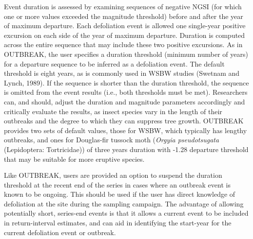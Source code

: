 \documentclass[review]{elsarticle} %
\begin{document}
Event duration is assessed by examining sequences of negative NGSI (for which one or more values exceeded the magnitude threshold) before and after the year of maximum departure. Each defoliation event is allowed one single-year positive excursion on each side of the year of maximum departure. Duration is computed across the entire sequence that may include these two positive excursions. As in OUTBREAK, the user specifies a duration threshold (minimum number of years) for a departure sequence to be inferred as a defoliation event. The default threshold is eight years, as is commonly used in WSBW studies (Swetnam and Lynch, 1989). If the sequence is shorter than the duration threshold, the sequence is omitted from the event results (i.e., both thresholds must be met). Researchers can, and should, adjust the duration and magnitude parameters accordingly and critically evaluate the results, as insect species vary in the length of their outbreaks and the degree to which they can suppress tree growth. OUTBREAK provides two sets of default values, those for WSBW, which typically has lengthy outbreaks, and ones for Douglas-fir tussock moth (\emph{Orgyia pseudotsugata} (Lepidoptera: Tortricidae)) of three years duration with -1.28 departure threshold that may be suitable for more eruptive species.

Like OUTBREAK, users are provided an option to suspend the duration threshold at the recent end of the series in cases where an outbreak event is known to be ongoing. This should be used if the user has direct knowledge of defoliation at the site during the sampling campaign. The advantage of allowing potentially short, series-end events is that it allows a current event to be included in return-interval estimates, and can aid in identifying the start-year for the current defoliation event or outbreak.
\end{document}
